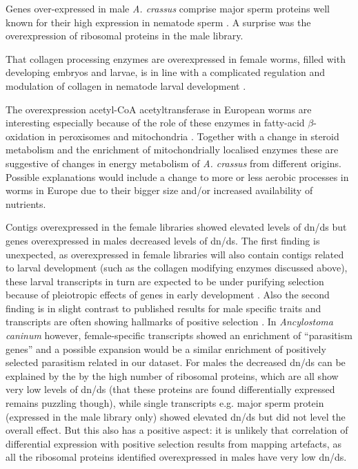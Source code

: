 Genes over-expressed in male \textit{A. crassus} comprise major sperm
proteins well known for their high expression in nematode sperm
\cite{pmid15275275}. A surprise was the overexpression of ribosomal
proteins in the male library.

That collagen processing enzymes are overexpressed in female worms,
filled with developing embryos and larvae, is in line with a
complicated regulation and modulation of collagen in nematode larval
development \cite{pmid10637627}.

The overexpression acetyl-CoA acetyltransferase in European worms are
interesting especially because of the role of these enzymes in
fatty-acid $\beta$-oxidation in peroxisomes and mitochondria
\cite{pmid4721607}. Together with a change in steroid metabolism and
the enrichment of mitochondrially localised enzymes these are
suggestive of changes in energy metabolism of \textit{A. crassus} from
different origins. Possible explanations would include a change to
more or less aerobic processes in worms in Europe due to their bigger
size and/or increased availability of nutrients.

Contigs overexpressed in the female libraries showed elevated levels
of dn/ds but genes overexpressed in males decreased levels of
dn/ds. The first finding is unexpected, as overexpressed in female
libraries will also contain contigs related to larval development
(such as the collagen modifying enzymes discussed above), these larval
transcripts in turn are expected to be under purifying selection
because of pleiotropic effects of genes in early development
\cite{pmid15371532}. Also the second finding is in slight contrast to
published results for male specific traits and transcripts are often
showing hallmarks of positive selection
\cite{pmid15795858,pmid11404480}. In \textit{Ancylostoma caninum}
however, female-specific transcripts showed an enrichment of
``parasitism genes'' \cite{pmid20470405} and a possible expansion
would be a similar enrichment of positively selected parasitism
related in our dataset. For males the decreased dn/ds can be explained
by the by the high number of ribosomal proteins, which are all show
very low levels of dn/ds (that these proteins are found differentially
expressed remains puzzling though), while single transcripts
e.g. major sperm protein (expressed in the male library only) showed
elevated dn/ds but did not level the overall effect. But this also has
a positive aspect: it is unlikely that correlation of differential
expression with positive selection results from mapping artefacts, as
all the ribosomal proteins identified overexpressed in males have very
low dn/ds.

